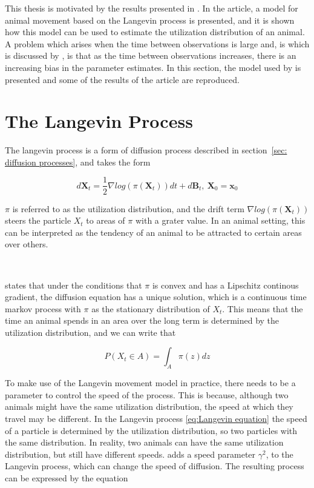 
\parencite{michelot_langevin_2019}


This thesis is motivated by the results presented in \parencite{michelot_langevin_2019}. In the article, a model for animal movement based on the Langevin process is presented, and it is shown how this model can be used to estimate the utilization distribution of an animal. A problem which arises when the time between observations is large and, is which is discussed by \parencite{michelot_langevin_2019}, is that as the time between observations increases, there is an increasing bias in the parameter estimates. In this section, the model used by \parencite{michelot_langevin_2019} is presented and some of the results of the article are reproduced.



\section{The Langevin Process}
The langevin process is a form of diffusion process described in section~\ref{sec: diffusion processes}, and takes the form

\begin{equation}
    d\textbf{X}_t = \frac{1}{2} \nabla log(\pi(\textbf{X}_t))dt + d\textbf{B}_t, \ \textbf{X}_0 = \textbf{x}_0
    \label{eq:Langevin equation}
\end{equation}


$\pi$ is referred to as the utilization distribution, and the drift term $\nabla log(\pi(\textbf{X}_t))$ steers the particle $X_t$ to areas of $\pi$ with a grater value. In an animal setting, this can be interpreted as the tendency of an animal to be attracted to certain areas over others.

\

\cite{dalalyan_theoretical_2017} states that under the conditions that $\pi$ is convex and has a Lipschitz continous gradient, the diffusion equation has a unique solution, which is a continuous time markov process with $\pi$ as the stationary distribution of $X_t$. This means that the time an animal spends in an area over the long term is determined by the utilization distribution, and we can write that

\begin{equation}
    P(\textbf{}{X}_t \in A ) = \int_A \pi(z)dz
\end{equation}


To make use of the Langevin movement model in practice, there needs to be a parameter to control the speed of the process. This is because, although two animals might have the same utilization distribution, the speed at which they travel may be different. In the Langevin process \eqref{eq:Langevin equation} the speed of a particle is determined by the utilization distribution, so two particles with the same distribution. In reality, two animals can have the same utilization distribution, but still have different speeds. \cite{roberts_optimal_1998} adds a speed parameter $\gamma^2$, to the Langevin process, which can change the speed of diffusion. The resulting process can be expressed by the equation

